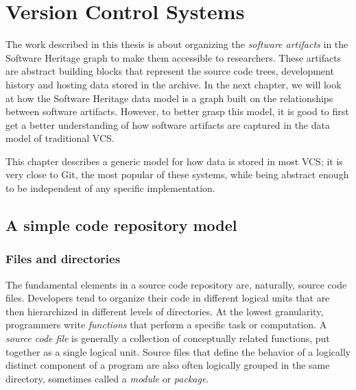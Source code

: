 \chapter{Version Control Systems}

The work described in this thesis is about organizing the \emph{software
artifacts} in the Software Heritage graph to make them accessible to
researchers. These artifacts are abstract building blocks that represent the
source code trees, development history and hosting data stored in the archive.
In the next chapter, we will look at how the Software Heritage data model is a
graph built on the relationships between software artifacts. However, to better
grasp this model, it is good to first get a better understanding of how
software artifacts are captured in the data model of traditional \gls{VCS}.

This chapter describes a generic model for how data is stored in most
\gls{VCS}; it is very close to Git, the most popular of these systems, while
being abstract enough to be independent of any specific implementation.

\section{A simple code repository model}

\subsection{Files and directories}

The fundamental elements in a source code repository are, naturally, source
code files. Developers tend to organize their code in different logical units
that are then hierarchized in different levels of directories. At the lowest
granularity, programmers write \emph{functions} that perform a specific task or
computation. A \emph{source code file} is generally a collection of
conceptually related functions, put together as a single logical unit. Source
files that define the behavior of a logically distinct component of a program
are also often logically grouped in the same directory, sometimes called a
\emph{module} or \emph{package}.

